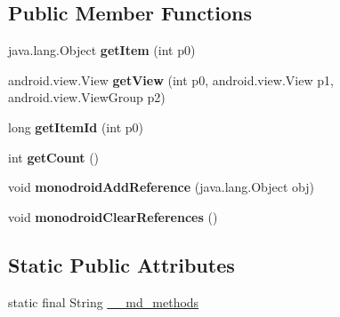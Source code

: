 \subsection*{Public Member Functions}
\begin{DoxyCompactItemize}
\item 
\mbox{\label{classmd5b60ffeb829f638581ab2bb9b1a7f4f3f_1_1_navigation_menu_renderer___menu_adapter_a3cb8fab254be843c50be7d6e6e705d1c}} 
java.\+lang.\+Object {\bfseries get\+Item} (int p0)
\item 
\mbox{\label{classmd5b60ffeb829f638581ab2bb9b1a7f4f3f_1_1_navigation_menu_renderer___menu_adapter_aa621b4dceee4ef8f0c60b60b62206b5a}} 
android.\+view.\+View {\bfseries get\+View} (int p0, android.\+view.\+View p1, android.\+view.\+View\+Group p2)
\item 
\mbox{\label{classmd5b60ffeb829f638581ab2bb9b1a7f4f3f_1_1_navigation_menu_renderer___menu_adapter_a97604532182d2b563da571e93f4470d2}} 
long {\bfseries get\+Item\+Id} (int p0)
\item 
\mbox{\label{classmd5b60ffeb829f638581ab2bb9b1a7f4f3f_1_1_navigation_menu_renderer___menu_adapter_a8d535563c8612033ca9ed9f3f7c61aae}} 
int {\bfseries get\+Count} ()
\item 
\mbox{\label{classmd5b60ffeb829f638581ab2bb9b1a7f4f3f_1_1_navigation_menu_renderer___menu_adapter_a9bf9b83d132d02411f1545779c1151c0}} 
void {\bfseries monodroid\+Add\+Reference} (java.\+lang.\+Object obj)
\item 
\mbox{\label{classmd5b60ffeb829f638581ab2bb9b1a7f4f3f_1_1_navigation_menu_renderer___menu_adapter_a94f3e1fc8dc319bcb897648b1c681949}} 
void {\bfseries monodroid\+Clear\+References} ()
\end{DoxyCompactItemize}
\subsection*{Static Public Attributes}
\begin{DoxyCompactItemize}
\item 
static final String \hyperlink{classmd5b60ffeb829f638581ab2bb9b1a7f4f3f_1_1_navigation_menu_renderer___menu_adapter_a09a523e0422c5d80d38ab17bbf6fe89b}{\+\_\+\+\_\+md\+\_\+methods}
\end{DoxyCompactItemize}


